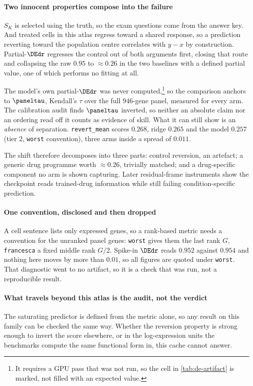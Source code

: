 \paragraph{Two innocent properties compose into the failure} $S_K$ is selected
using the truth, so the exam questions come from the answer key. And treated
cells in this atlas regress toward a shared response, so a prediction reverting
toward the population centre correlates with $y - x$ by construction.
Partial-$\DEdr$ regresses the control out of both arguments first, closing that
route and collapsing the raw $0.95$ to $\approx 0.26$ in the two baselines with
a defined partial value, one of which performs no fitting at all.

The model's own partial-$\DEdr$ was never computed,\footnote{It requires a GPU
pass that was not run, so the cell in \cref{tab:de-artifact} is marked, not
filled with an expected value.} so the comparison anchors to $\paneltau$,
Kendall's $\tau$ over the full $\num{946}$-gene panel, measured for every arm.
The calibration audit finds $\paneltau$ inverted, so neither an absolute claim
nor an ordering read off it counts as evidence of skill. What it can still show
is an \emph{absence} of separation. \texttt{revert\_mean} scores $0.268$, ridge
$0.265$ and the model $0.257$ (tier 2, \texttt{worst} convention), three arms
inside a spread of $0.011$.

The shift therefore decomposes into three parts: control reversion, an
artefact; a generic drug programme worth $\approx 0.26$, trivially matched; and
a drug-specific component no arm is shown capturing. Later residual-frame
instruments show the checkpoint reads trained-drug information while still
failing condition-specific prediction.

\paragraph{One convention, disclosed and then dropped} A cell sentence lists
only expressed genes, so a rank-based metric needs a convention for the unranked
panel genes: \texttt{worst} gives them the last rank $G$, \texttt{francesca} a
fixed middle rank $G/2$. Spike-in $\DEdr$ reads $0.952$ against $0.954$ and
nothing here moves by more than $0.01$, so all figures are quoted under
\texttt{worst}. That diagnostic went to no artifact, so it is a check that was
run, not a reproducible result.

\paragraph{What travels beyond this atlas is the audit, not the verdict} The
saturating predictor is defined from the metric alone, so any result on this
family can be checked the same way. Whether the reversion property is strong
enough to invert the score elsewhere, or in the log-expression units the
benchmarks compute the same functional form in, this cache cannot answer.

